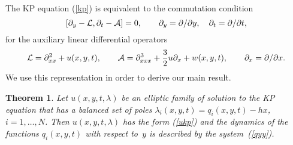 \documentclass[a4paper,11pt]{article}
\newcommand{\p}{\partial}
\newcommand{\cL}{{\cal L}}
\newcommand{\cA}{{\cal A}}
\theoremstyle{plain}
\newtheorem{teo}{Theorem}
\theoremstyle{remark}
\begin{document}
The KP equation (\ref{kp}) is equivalent to the commutation condition
\begin{equation}\label{lakp}
\left[ \p_y-\cL, \p_t-\cA\right]=0,
\qquad \p_y=\p/\p y,\quad \p_t=\p/\p t,
\end{equation}
for the auxiliary linear differential operators
$$
\cL=\p^2_{xx}+u(x,y,t), \qquad
\cA=\p^3_{xxx}+\frac{3}{2} u \p_x+w(x,y,t),\qquad
\p_x=\p/\p x.
$$
We use this representation in order to derive our main result.
\begin{teo}
Let $u(x,y,t,\lambda)$ be an elliptic family of solution to
the KP equation that has a balanced set of poles
$\lambda_i(x,y,t)=q_i(x,y,t)-h x$, $i=1,\dots,N$.
Then $u(x,y,t,\lambda)$ has the form \emph{(\ref{ukp})} and the dynamics
of the functions $q_i(x,y,t)$ with respect to~$y$ is described by
the system~\emph{(\ref{qyy})}.
\end{teo}
\end{document}
